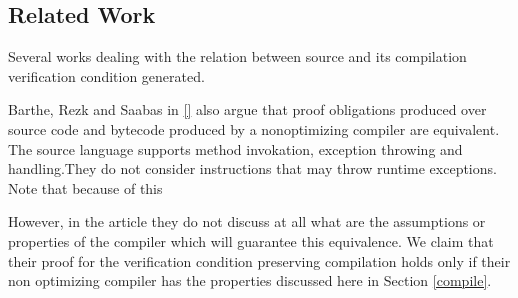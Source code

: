 \subsection{Related Work}\label{pog:relWork}

Several works dealing with the relation between 
source and its compilation verification condition generated.

Barthe, Rezk and Saabas in \ref{} also argue that proof obligations produced
over source code and
bytecode produced by a nonoptimizing compiler   are equivalent.
The source language supports method invokation, exception throwing and handling.They do not consider instructions that may throw
runtime exceptions. Note that because of this 

 However, in the article they do not discuss at all what are the assumptions
or properties of the compiler which will guarantee this equivalence. We claim that their proof for the verification condition preserving compilation holds only if their non optimizing compiler has the properties discussed here in Section
 \ref{compile}. 



